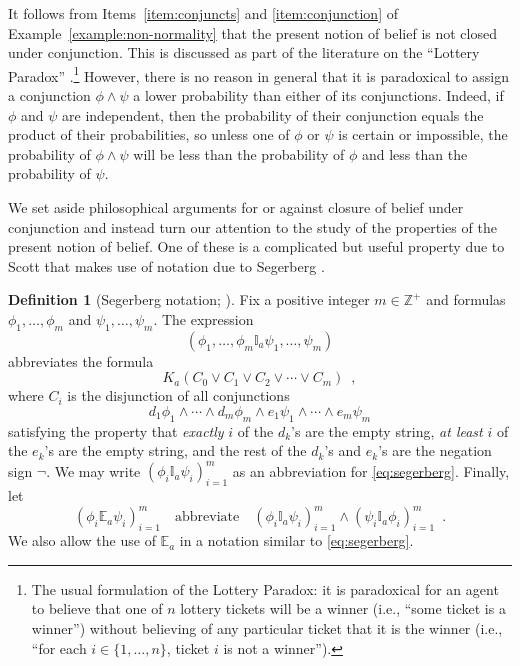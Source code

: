 \documentclass[12pt]{article}
\theoremstyle{definition}
\newtheorem{definition}[theorem]{Definition}
\newcommand{\Int}{\mathbb{Z}}  %
\begin{document}
It follows from Items~\ref{item:conjuncts} and \ref{item:conjunction}
of Example~\ref{example:non-normality} that the present notion of
belief is not closed under conjunction.  This is discussed as part of
the literature on the ``Lottery Paradox''
\cite{Kyburg1961:patlorb}.\footnote{The usual formulation of the
  Lottery Paradox: it is paradoxical for an agent to believe that one
  of $n$ lottery tickets will be a winner (i.e., ``some ticket is a
  winner'') without believing of any particular ticket that it is the
  winner (i.e., ``for each $i\in\{1,\dots,n\}$, ticket $i$ is not a
  winner'').}  However, there is no reason in general that it is
paradoxical to assign a conjunction $\phi \land \psi$ a lower
probability than either of its conjunctions.  Indeed, if $\phi$ and
$\psi$ are independent, then the probability of their conjunction
equals the product of their probabilities, so unless one of $\phi$ or
$\psi$ is certain or impossible, the probability of $\phi \land \psi$
will be less than the probability of $\phi$ and less than the
probability of $\psi$.

We set aside philosophical arguments for or against closure of belief
under conjunction and instead turn our attention to the study of the
properties of the present notion of belief.  One of these is a
complicated but useful property due to Scott \cite{Sco64:JMP} that
makes use of notation due to Segerberg \cite{Segerberg1971:qpiams}.

\begin{definition}[Segerberg notation; \cite{Segerberg1971:qpiams}]
  \label{definition:segerberg-notation}
  Fix a positive integer $m\in\Int^+$ and formulas
  $\phi_1,\dots,\phi_m$ and $\psi_1,\dots,\psi_m$.  The expression
  \begin{equation}
    (\phi_1,\dots,\phi_m\mathbb{I}_a\psi_1,\dots,\psi_m)
    \label{eq:segerberg}
  \end{equation}
  abbreviates the formula
  \[
  K_a(C_0\lor C_1\lor C_2 \lor \cdots \lor C_m)\enspace,
  \]
  where $C_i$ is the disjunction of all conjunctions
  \[
  d_1\phi_1\land\cdots\land d_m\phi_m \land
  e_1\psi_1\land\cdots\land e_m\psi_m
  \]
  satisfying the property that \emph{exactly} $i$ of the $d_k$'s are the
  empty string, \emph{at least} $i$ of the $e_k$'s are the empty string, and
  the rest of the $d_k$'s and $e_k$'s are the negation sign $\lnot$.
  We may write $(\phi_i\mathbb{I}_a\psi_i)_{i=1}^m$ as an
  abbreviation for \eqref{eq:segerberg}.  Finally, let
  \[
  (\phi_i\mathbb{E}_a\psi_i)_{i=1}^m
  \quad\text{abbreviate}\quad
  (\phi_i\mathbb{I}_a\psi_i)_{i=1}^m\land(\psi_i\mathbb{I}_a\phi_i)_{i=1}^m
  \enspace.
  \]
  We also allow the use of $\mathbb{E}_a$ in a notation similar to 
  \eqref{eq:segerberg}.
\end{definition}
\end{document}
